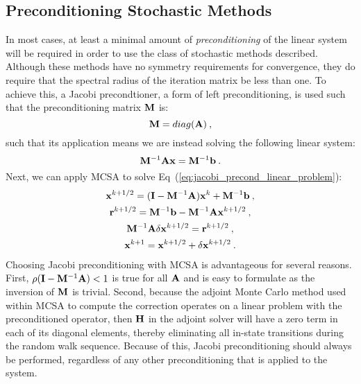 \subsection{Preconditioning Stochastic Methods}
\label{sec:stochastic_preconditioning}
In most cases, at least a minimal amount of \textit{preconditioning}
of the linear system will be required in order to use the class of
stochastic methods described. Although these methods have no symmetry
requirements for convergence, they do require that the spectral radius
of the iteration matrix be less than one. To achieve this, a Jacobi
precondtioner, a form of left preconditioning, is used such that the
preconditioning matrix $\mathbf{M}$ is:
\begin{equation}
  \mathbf{M} = diag(\mathbf{A})\:,
  \label{eq:jacobi_preconditioner}
\end{equation}
such that its application means we are instead solving the following
linear system:
\begin{equation}
  \mathbf{M}^{-1}\mathbf{A}\mathbf{x} = \mathbf{M}^{-1}\mathbf{b}\:.
  \label{eq:jacobi_precond_linear_problem}
\end{equation}
Next, we can apply MCSA to solve
Eq~(\ref{eq:jacobi_precond_linear_problem}): 
\begin{subequations}
  \begin{gather}
    \mathbf{x}^{k+1/2} = (\mathbf{I} - \mathbf{M}^{-1}\mathbf{A})\mathbf{x}^k +
    \mathbf{M}^{-1}\mathbf{b}\:,\\ \mathbf{r}^{k+1/2} = \mathbf{M}^{-1}\mathbf{b} -
    \mathbf{M}^{-1}\mathbf{A}\mathbf{x}^{k+1/2}\:,\\ \mathbf{M}^{-1}\mathbf{A}\delta\mathbf{x}^{k+1/2}
    = \mathbf{r}^{k+1/2}\:,\\ \mathbf{x}^{k+1} = \mathbf{x}^{k+1/2} + \delta
    \mathbf{x}^{k+1/2}\:.
    \label{eq:jacobi_preconditioned_mcsa}
  \end{gather}
\end{subequations}
Choosing Jacobi preconditioning with MCSA is advantageous for several
reasons. First, $\rho(\mathbf{I} - \mathbf{M}^{-1}\mathbf{A}) < 1$ is true for
all $\mathbf{A}$ and is easy to formulate as the inversion of $\mathbf{M}$ is
trivial. Second, because the adjoint Monte Carlo method used within MCSA to
compute the correction operates on a linear problem with the
preconditioned operator, then $\mathbf{H}$ in the adjoint solver will have
a zero term in each of its diagonal elements, thereby eliminating
all in-state transitions during the random walk sequence. Because of
this, Jacobi preconditioning should always be performed, regardless of
any other preconditioning that is applied to the system.

